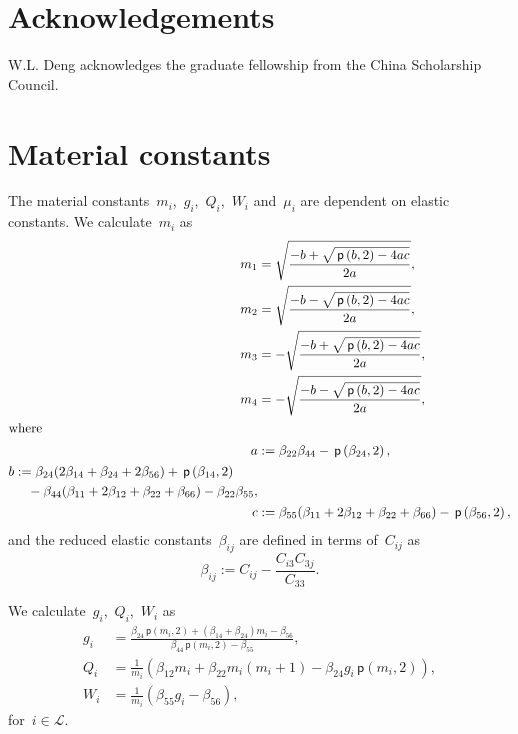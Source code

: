 \documentclass[preprint,10pt,times]{elsarticle}
\numberwithin{equation}{section}
\newcommand{\pr}[1]{\left( #1 \right)}
\newcommand{\p}{\,\mathsf{p}}
\renewcommand{\>}{$\Rightarrow$}
\begin{document}
\section*{Acknowledgements}
W.L. Deng acknowledges the graduate fellowship from the China Scholarship Council.


\newpage
\appendix

\section{Material constants}
\label{Appen:MatConst}
The material constants~$m_i$,~$g_i$,~$Q_i$,~$W_i$ and~$\mu_i$ are dependent on elastic constants.
We calculate~$m_i$ as
\begin{subequations}
	\begin{align}
	 m_1 & =  \sqrt{\frac{-b +\sqrt{\p\pr{b,2} - 4ac}}{2a}}, \\
	 m_2 & =  \sqrt{\frac{-b -\sqrt{\p\pr{b,2} - 4ac}}{2a}}, \\
	 m_3 & =  -\sqrt{\frac{-b +\sqrt{\p\pr{b,2} - 4ac}}{2a}}, \\
	 m_4 & =  -\sqrt{\frac{-b -\sqrt{\p\pr{b,2} - 4ac}}{2a}}, \\
	\intertext{where}
	 a & :=  \beta_{22} \beta_{44} - \p\pr{\beta_{24},2}, \\
	\begin{split}
	 b & := \beta_{24}(2\beta_{14} + \beta_{24} + 2\beta_{56}) + \p\pr{\beta_{14},2} \\
	 & \quad - \beta_{44}(\beta_{11} + 2\beta_{12} + \beta_{22} + \beta_{66}) - \beta_{22} \beta_{55},
	\end{split} \\
	c & :=  \beta_{55}(\beta_{11} + 2\beta_{12} + \beta_{22} + \beta_{66})-\p\pr{\beta_{56},2},
	\end{align}
\end{subequations}
and the reduced elastic constants~$\beta_{ij}$ are defined in terms of~$C_{ij}$ as
\begin{equation}
\beta_{ij} := C_{ij}-\frac{C_{i3} C_{3j}}{C_{33}}.
\end{equation}


We calculate~$g_i$,~$Q_i$,~$W_i$ as
\begin{subequations}
	\begin{align}
	g_i & = \frac{\beta_{24}\p\pr{m_i,2}+(\beta_{14} + \beta_{24})m_i - \beta_{56}}{\beta_{44}\p\pr{m_i,2} - \beta_{55}}, \\
	Q_i & = \frac{1}{m_i} \pr{\beta_{12}m_i + \beta_{22}m_i(m_i+1) - \beta_{24} g_i \p\pr{m_i,2}}, \\
	W_i & = \frac{1}{m_i}\pr{\beta_{55} g_i - \beta_{56}},
	\end{align}
\end{subequations}
for~$ i \in \mathcal{L}$.
\end{document}
